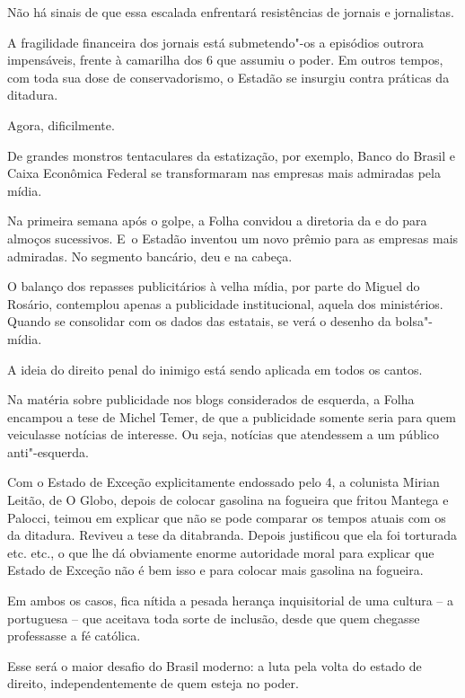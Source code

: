 Não há sinais de que essa escalada enfrentará resistências de jornais e
jornalistas.

A fragilidade financeira dos jornais está submetendo"-os a episódios
outrora impensáveis, frente à camarilha dos 6 que assumiu o poder. Em
outros tempos, com toda sua dose de conservadorismo, o Estadão se
insurgiu contra práticas da ditadura.

Agora, dificilmente.

De grandes monstros tentaculares da estatização, por exemplo, Banco do
Brasil e Caixa Econômica Federal se transformaram nas empresas mais
admiradas pela mídia.

Na primeira semana após o golpe, a Folha convidou a diretoria da  e
do  para almoços sucessivos. E~o Estadão inventou um novo prêmio para
as empresas mais admiradas. No segmento bancário, deu  e  na
cabeça.

O balanço dos repasses publicitários à velha mídia, por parte do Miguel
do Rosário, contemplou apenas a publicidade institucional, aquela dos
ministérios. Quando se consolidar com os dados das estatais, se verá o
desenho da bolsa"-mídia.

A ideia do direito penal do inimigo está sendo aplicada em todos os
cantos.

Na matéria sobre publicidade nos blogs considerados de esquerda, a Folha
encampou a tese de Michel Temer, de que a publicidade somente seria para
quem veiculasse notícias de interesse. Ou seja, notícias que atendessem
a um público anti"-esquerda.

Com o Estado de Exceção explicitamente endossado pelo 4, a colunista
Mirian Leitão, de O Globo, depois de colocar gasolina na fogueira que
fritou Mantega e Palocci, teimou em explicar que não se pode comparar os
tempos atuais com os da ditadura. Reviveu a tese da ditabranda. Depois
justificou que ela foi torturada etc. etc., o que lhe dá obviamente
enorme autoridade moral para explicar que Estado de Exceção não é bem
isso e para colocar mais gasolina na fogueira.

Em ambos os casos, fica nítida a pesada herança inquisitorial de uma
cultura -- a portuguesa -- que aceitava toda sorte de inclusão, desde
que quem chegasse professasse a fé católica.

Esse será o maior desafio do Brasil moderno: a luta pela volta do estado
de direito, independentemente de quem esteja no poder.
